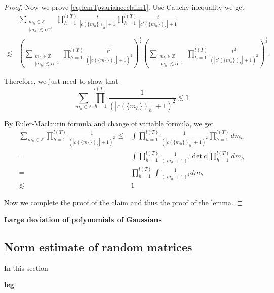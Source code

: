 \begin{proof}
Now we prove \eqref{eq.lemTpvarianceclaim1}. Use Cauchy inequality we get
\begin{equation}
\begin{split}
    &\sum_{\substack{m_{h}\in \mathbb{Z}\\ |m_{h}|\lesssim \alpha^{-1}}} \prod_{h=1}^{l(T)}\frac{t}{|c(\{m_{h}\})_{h}|+1} \prod_{h=1}^{l(T)}\frac{t}{|c'(\{m_{h}\})_{h}|+1}
    \\
    \lesssim & \left(\sum_{\substack{m_{h}\in \mathbb{Z}\\ |m_{h}|\lesssim \alpha^{-1}}} \prod_{h=1}^{l(T)}\frac{t^2}{(|c(\{m_{h}\})_{h}|+1)^2} \right)^{\frac{1}{2}} 
    \left(\sum_{\substack{m_{h}\in \mathbb{Z}\\ |m_{h}|\lesssim \alpha^{-1}}} \prod_{h=1}^{l(T)}\frac{t^2}{(|c'(\{m_{h}\})_{h}|+1)^2} \right)^{\frac{1}{2}}.
\end{split}
\end{equation}

Therefore, we just need to show that 
\begin{equation}
    \sum_{m_{h}\in \mathbb{Z}} \prod_{h=1}^{l(T)}\frac{1}{(|c(\{m_{h}\})_{h}|+1)^2}\lesssim 1 
\end{equation}

By Euler-Maclaurin formula and change of variable formula, we get
\begin{equation}
\begin{split}
    \sum_{m_{h}\in \mathbb{Z}} \prod_{h=1}^{l(T)}\frac{1}{(|c(\{m_{h}\})_{h}|+1)^2}\le& \int  \prod_{h=1}^{l(T)}\frac{1}{(|c(\{m_{h}\})_{h}|+1)^2}\prod_{h=1}^{l(T)} dm_{h}
    \\
    =& \int  \prod_{h=1}^{l(T)}\frac{1}{(|m_{h}|+1)^2}|\text{det}\ c|\prod_{h=1}^{l(T)}  dm_{h}
    \\
    =&\prod_{h=1}^{l(T)}\int \frac{1}{(|m_{h}|+1)^2}  dm_{h}
    \\
    \lesssim & 1
\end{split}
\end{equation}

Now we complete the proof of the claim and thus the proof of the lemma.
\end{proof}

\textbf{{Large deviation of polynomials of Gaussians}
}



\subsection{Norm estimate of random matrices} \label{sec.randommatrices}









In this section 
  
\textbf{leg}





